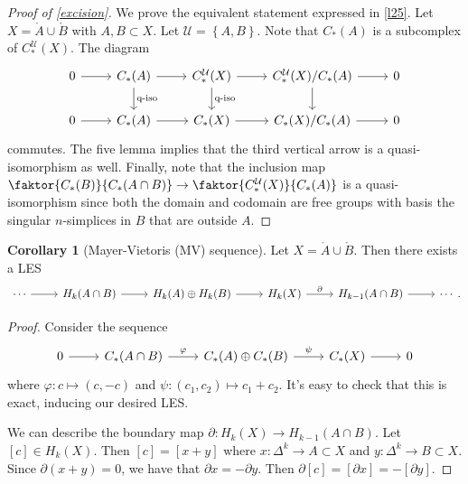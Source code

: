\documentclass[10pt,letterpaper,cm]{nupset}
\theoremstyle{definition}
\theoremstyle{theorem}
\newtheorem{corollary}[definition]{Corollary}
\theoremstyle{remark}
\newcommand{\U}{\mathcal U}
\newcommand{\1}{\mathbb{1}}
\newcommand{\0}{\vec 0}
\begin{document}
\medskip

\begin{proof}[Proof of \cref{excision}]
We prove the equivalent statement expressed in \cref{l25}. Let $X = \mathring{A}\cup \mathring{B}$ with $A,B\subset X$. Let $\U =\left\{A, B\right\}$. Note that $C_{\ast}(A)$ is a subcomplex of $C_{\ast}^{\U}(X)$. The diagram
\[
\begin{tikzcd}
0 \arrow[r] & C_{\ast}(A) \arrow[r] \arrow[d, "\text{q-iso}"] & C_{\ast}^{\U}(X) \arrow[r] \arrow[d, "\text{q-iso}"] & C_{\ast}^{\U}(X)/C_{\ast}(A) \arrow[r] \arrow[d] & 0 \\
0 \arrow[r] & C_{\ast}(A) \arrow[r]                          & C_{\ast}(X) \arrow[r]                                & C_{\ast}(X)/C_{\ast}(A) \arrow[r]                & 0
\end{tikzcd}
\] commutes. The five lemma implies that the third vertical arrow is a quasi-isomorphism as well. Finally, note that the inclusion map $\faktor{C_{\ast}(B)}{C_{\ast}(A\cap B)} \to \faktor{C_{\ast}^{\U}(X)}{C_{\ast}(A)}$ is a quasi-isomorphism since both the domain and codomain are free groups with basis the singular $n$-simplices in $B$ that are outside $A$.
\end{proof}

\begin{corollary}[Mayer-Vietoris (MV) sequence]
Let $X= \mathring{A} \cup \mathring{B}$. Then there exists a LES 
\[
\begin{tikzcd}
\cdots \arrow[r] & H_k(A\cap B) \arrow[r] & H_k(A)\oplus H_k(B) \arrow[r] & H_k(X) \arrow[r, "\partial"] & H_{k-1}(A\cap B) \arrow[r] & \cdots
\end{tikzcd}
.\]
\end{corollary}
\begin{proof}
Consider the sequence
\[
\begin{tikzcd}
0 \arrow[r] & C_{\ast}(A\cap B) \arrow[r, "\varphi"] & C_{\ast}(A)\oplus C_{\ast}(B) \arrow[r, "\psi"] & C_{\ast}(X) \arrow[r] & 0
\end{tikzcd}
\] where $\varphi : c \mapsto \left(c, {-c}\right)$ and $\psi : \left(c_1, c_2\right) \mapsto c_1 + c_2$. It's easy to check that this is exact, inducing our desired LES.

\medskip

 We can describe the boundary map $\partial : H_k(X) \to H_{k-1}(A\cap B)$. Let $\left[c\right] \in H_k(X)$. Then $\left[c\right] = 
 \left[x+y\right]$ where $x : \Delta^k \to A\subset X$ and $y: \Delta^k \to B\subset X$. Since $\partial(x+y)  =0$, we have that $\partial{x}={-\partial{y}}$. Then $\partial{[c]} =[\partial{x}] = {-[\partial{y}]}$.
\end{proof}
\end{document}
